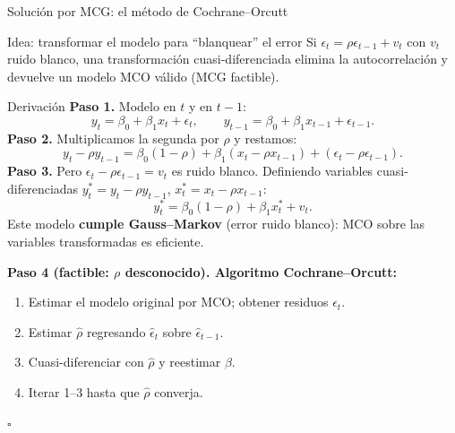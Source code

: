 \documentclass{beamer}
\begin{document}
\begin{frame}[allowframebreaks]{Solución por MCG: el método de Cochrane--Orcutt}

\begin{block}{Idea: transformar el modelo para ``blanquear'' el error}
Si $\epsilon_t=\rho\epsilon_{t-1}+v_t$ con $v_t$ ruido blanco, una transformación cuasi-diferenciada elimina la autocorrelación y devuelve un modelo MCO válido (MCG factible).
\end{block}

\begin{exampleblock}{Derivación}
\textbf{Paso 1.} Modelo en $t$ y en $t-1$:
\[
y_t=\beta_0+\beta_1 x_t+\epsilon_t,\qquad y_{t-1}=\beta_0+\beta_1 x_{t-1}+\epsilon_{t-1}.
\]
\textbf{Paso 2.} Multiplicamos la segunda por $\rho$ y restamos:
\[
y_t-\rho y_{t-1}=\beta_0(1-\rho)+\beta_1(x_t-\rho x_{t-1})+(\epsilon_t-\rho\epsilon_{t-1}).
\]
\framebreak
\textbf{Paso 3.} Pero $\epsilon_t-\rho\epsilon_{t-1}=v_t$ es ruido blanco. Definiendo variables cuasi-diferenciadas $y_t^*=y_t-\rho y_{t-1}$, $x_t^*=x_t-\rho x_{t-1}$:
\[
y_t^*=\beta_0(1-\rho)+\beta_1 x_t^* + v_t.
\]
Este modelo \textbf{cumple Gauss--Markov} (error ruido blanco): MCO sobre las variables transformadas es eficiente.

\textbf{Paso 4 (factible: $\rho$ desconocido). Algoritmo Cochrane--Orcutt:}
\begin{enumerate}
  \item Estimar el modelo original por MCO; obtener residuos $\hat\epsilon_t$.
  \item Estimar $\hat\rho$ regresando $\hat\epsilon_t$ sobre $\hat\epsilon_{t-1}$.
  \item Cuasi-diferenciar con $\hat\rho$ y reestimar $\beta$.
  \item Iterar 1--3 hasta que $\hat\rho$ converja.
\end{enumerate}
\hfill $\square$
\end{exampleblock}

\end{frame}
\end{document}
